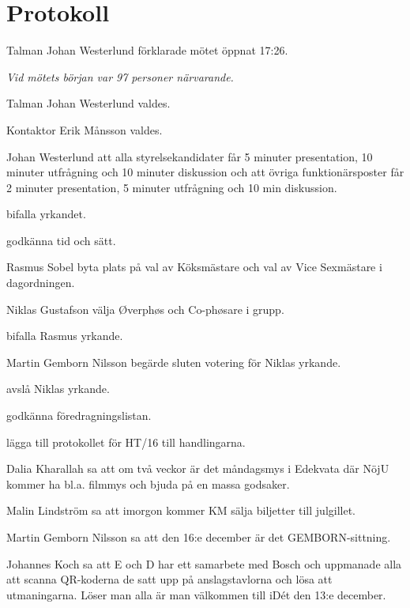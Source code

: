 \documentclass[10pt]{article}
\def\mo{Johan Westerlund}
\def\ms{Erik Månsson}
\begin{document}
\section*{Protokoll}
\begin{paragrafer}
Talman {\mo} förklarade mötet öppnat 17:26.

\emph{Vid mötets början var 97 personer närvarande.}

Talman {\mo} valdes.

Kontaktor {\ms} valdes.

Johan Westerlund \ypa att alla styrelsekandidater får 5 minuter presentation, 10 minuter utfrågning och 10 minuter diskussion och att övriga funktionärsposter får 2 minuter presentation, 5 minuter utfrågning och 10 min diskussion.

\Mba bifalla yrkandet.

\Mba godkänna tid och sätt.

\valavj

\emph{\ingaadj}

Rasmus Sobel \ypa byta plats på val av Köksmästare och val av Vice Sexmästare i dagordningen.

Niklas Gustafson \ypa välja Øverphøs och Co-phøsare i grupp.

\Mba bifalla Rasmus yrkande.

Martin Gemborn Nilsson begärde sluten votering för Niklas yrkande.

\Mba avslå Niklas yrkande.

\Mba godkänna föredragningslistan.

\Mba lägga till protokollet för HT/16 till handlingarna.

Dalia Kharallah sa att om två veckor är det måndagsmys i Edekvata där NöjU kommer ha bl.a. filmmys och bjuda på en massa godsaker.

Malin Lindström sa att imorgon kommer KM sälja biljetter till julgillet.

Martin Gemborn Nilsson sa att den 16:e december är det GEMBORN-sittning.

Johannes Koch sa att E och D har ett samarbete med Bosch och uppmanade alla att scanna QR-koderna de satt upp på anslagstavlorna och lösa att utmaningarna. Löser man alla är man välkommen till iDét den 13:e december.


\end{paragrafer}
\end{document}
